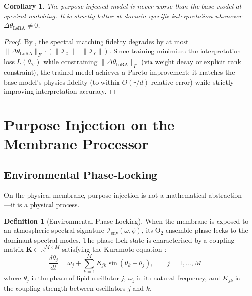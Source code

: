 \documentclass[11pt,twocolumn,a4paper]{article}
\newtheorem{corollary}[theorem]{Corollary}
\theoremstyle{definition}
\newtheorem{definition}[theorem]{Definition}
\theoremstyle{remark}
\newcommand{\LoRA}{\mathrm{LoRA}}
\newcommand{\R}{\mathbb{R}}
\begin{document}
\begin{corollary}\label{cor:no-worse}
The purpose-injected model is never worse than the base model at spectral matching.  It is strictly better at domain-specific interpretation whenever $\Delta\theta_{\LoRA} \neq 0$.
\end{corollary}

\begin{proof}
By , the spectral matching fidelity degrades by at most $\|\Delta\theta_{\LoRA}\|_F \cdot (\|\mathcal{I}_X\| + \|\mathcal{I}_Y\|)$.  Since training minimises the interpretation loss $L(\theta_{\mathcal{D}})$ while constraining $\|\Delta\theta_{\LoRA}\|_F$ (via weight decay or explicit rank constraint), the trained model achieves a Pareto improvement: it matches the base model's physics fidelity (to within $O(r/d)$ relative error) while strictly improving interpretation accuracy.
\end{proof}




\section{Purpose Injection on the Membrane Processor}\label{sec:membrane-purpose}

\subsection{Environmental Phase-Locking}

On the physical membrane, purpose injection is not a mathematical abstraction---it is a physical process.

\begin{definition}[Environmental Phase-Locking]\label{def:phase-locking}
When the membrane is exposed to an atmospheric spectral signature $\mathcal{I}_{\mathrm{env}}(\omega, \phi)$, its O$_2$ ensemble phase-locks to the dominant spectral modes.  The phase-lock state is characterised by a coupling matrix $\mathbf{K} \in \R^{M \times M}$ satisfying the Kuramoto equation \citep{kuramoto1984chemical}:
\begin{equation}\label{eq:kuramoto}
    \frac{d\theta_j}{dt} = \omega_j + \sum_{k=1}^{M} K_{jk} \sin(\theta_k - \theta_j), \qquad j = 1, \ldots, M,
\end{equation}
where $\theta_j$ is the phase of lipid oscillator $j$, $\omega_j$ is its natural frequency, and $K_{jk}$ is the coupling strength between oscillators $j$ and $k$.
\end{definition}
\end{document}
